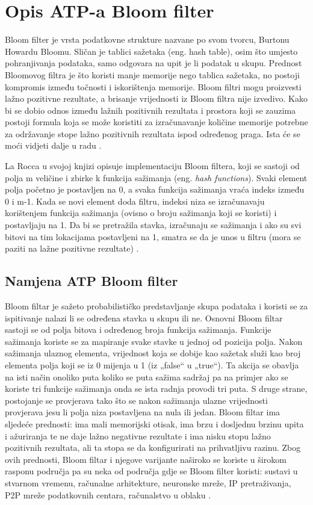 \documentclass{foi}
\begin{document}
\chapter{Opis ATP-a Bloom filter}

Bloom filter je vrsta podatkovne strukture nazvane po svom tvorcu, Burtonu Howardu Bloomu. Sličan je tablici sažetaka (eng. hash table), osim što umjesto pohranjivanja podataka, samo odgovara na upit je li podatak u skupu. Prednost Bloomovog filtra je što koristi manje memorije nego tablica sažetaka, no postoji kompromis između točnosti i iskorištenja memorije. Bloom filtri mogu proizvesti lažno pozitivne rezultate, a brisanje vrijednosti iz Bloom filtra nije izvedivo. Kako bi se dobio odnos između lažnih pozitivnih rezultata i prostora koji se zauzima postoji formula koja se može koristiti za izračunavanje količine memorije potrebne za održavanje stope lažno pozitivnih rezultata ispod određenog praga. Ista će se moći vidjeti dalje u radu \cite{la2021advanced}.

La Rocca u svojoj knjizi opisuje implementaciju Bloom filtera, koji se sastoji od polja m veličine i zbirke k funkcija sažimanja (eng. \textit{hash functions}). Svaki element polja početno je postavljen na 0, a svaka funkcija sažimanja vraća indeks između 0 i m-1. Kada se novi element doda filtru, indeksi niza se izračunavaju korištenjem funkcija sažimanja (ovisno o broju sažimanja koji se koristi) i postavljaju na 1. Da bi se pretražila stavka, izračunaju se sažimanja i ako su svi bitovi na tim lokacijama postavljeni na 1, smatra se da je unos u filtru (mora se paziti na lažne pozitivne rezultate) \cite{la2021advanced}.

\section{Namjena ATP Bloom filter}
Bloom filtar je sažeto probabilističko predstavljanje skupa podataka i koristi se za ispitivanje nalazi li se određena stavka u skupu ili ne. Osnovni Bloom filtar sastoji se od polja bitova i određenog broja funkcija sažimanja. Funkcije sažimanja koriste se za mapiranje svake stavke u jednoj od pozicija polja. Nakon sažimanja ulaznog elementa, vrijednost koja se dobije kao sažetak služi kao broj elementa polja koji se iz 0 mijenja u 1 (iz „false“ u „true“). Ta akcija se obavlja na isti način onoliko puta koliko se puta sažima sadržaj pa na primjer ako se koriste tri funkcije sažimanja onda se ista radnja provodi tri puta. S druge strane, postojanje se provjerava tako što se nakon sažimanja ulazne vrijednosti provjerava jesu li polja niza postavljena na nula ili jedan. Bloom filtar ima sljedeće prednosti: ima mali memorijski otisak, ima brzu i dosljednu brzinu upita i ažuriranja te ne daje lažno negativne rezultate i ima nisku stopu lažno pozitivnih rezultata, ali ta stopa se da konfigurirati na prihvatljivu razinu. Zbog ovih prednosti, Bloom filtar i njegove varijante naširoko se koriste u širokom rasponu područja pa su neka od područja gdje se Bloom filter koristi: sustavi u stvarnom vremenu, računalne arhitekture, neuronske mreže, IP pretraživanja, P2P mreže podatkovnih centara, računalstvo u oblaku  \cite{wu2021elastic}.
\end{document}
